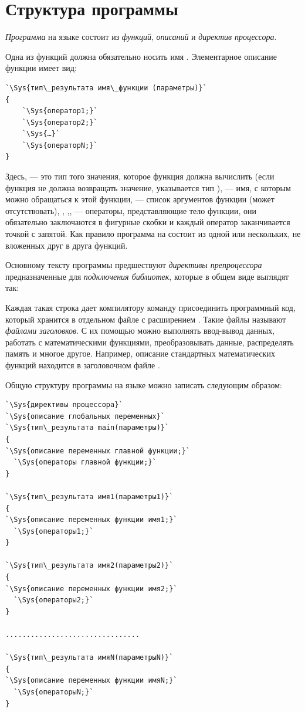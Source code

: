 \noindent{}

\section[Структура программы]{Структура программы}\label{ch02:8}
\emph{Программа} на языке  состоит из
\emph{функций}, \emph{описаний} и \emph{директив процессора}. 

Одна из функций должна обязательно носить имя . Элементарное описание функции имеет вид:

\begin{lstlisting}
`\Sys{тип\_результата имя\_функции (параметры)}`
{
    `\Sys{оператор1;}`
    `\Sys{оператор2;}`
    `\Sys{…}`
    `\Sys{операторN;}`
}
\end{lstlisting}

Здесь,  --- это тип того значения, которое функция должна вычислить (если функция не
должна возвращать значение, указывается тип ),  --- имя, с которым
можно обращаться к этой функции,  --- список аргументов функции (может отсутствовать),
, ,,  --- операторы, представляющие
тело функции, они обязательно заключаются в фигурные скобки и каждый оператор заканчивается точкой с запятой. Как
правило программа на  состоит из одной или нескольких, не вложенных друг в друга функций.

Основному тексту программы предшествуют \emph{директивы препроцессора}
предназначенные для \emph{подключения библиотек}, которые в общем виде
выглядят так:


Каждая такая строка дает компилятору команду присоединить программный код, который хранится в отдельном файле с
расширением . Такие файлы называют \emph{файлами заголовков}. С их помощью можно
выполнять ввод-вывод данных, работать с математическими функциями, преобразовывать данные, распределять память и многое
другое. Например, описание стандартных математических функций находится в заголовочном файле .

Общую структуру программы на языке  можно записать следующим образом:
\begin{lstlisting}
`\Sys{директивы процессора}`
`\Sys{описание глобальных переменных}`
`\Sys{тип\_результата main(параметры)}`
{
`\Sys{описание переменных главной функции;}`
  `\Sys{операторы главной функции;}`
}

`\Sys{тип\_результата имя1(параметры1)}`
{
`\Sys{описание переменных функции имя1;}`
  `\Sys{операторы1;}`
}

`\Sys{тип\_результата имя2(параметры2)}`
{
`\Sys{описание переменных функции имя2;}`
  `\Sys{операторы2;}`
}

................................

`\Sys{тип\_результата имяN(параметрыN)}`
{
`\Sys{описание переменных функции имяN;}`
  `\Sys{операторыN;}`
}
\end{lstlisting}

